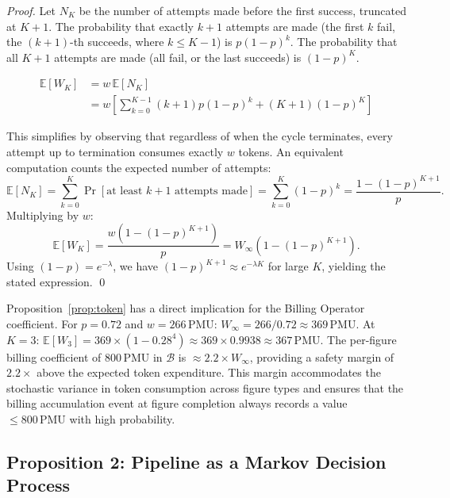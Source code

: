 \begin{proof}
Let $N_K$ be the number of attempts made before the first success, truncated at $K+1$.
The probability that exactly $k+1$ attempts are made (the first $k$ fail, the $(k+1)$-th
succeeds, where $k\leq K-1$) is $p(1-p)^k$.
The probability that all $K+1$ attempts are made (all fail, or the last succeeds) is
$(1-p)^K$.

\begin{align*}
\mathbb{E}[W_K] &= w\,\mathbb{E}[N_K] \\
&= w\left[\sum_{k=0}^{K-1}(k+1)p(1-p)^k + (K+1)(1-p)^K\right]
\end{align*}

This simplifies by observing that regardless of when the cycle terminates,
every attempt up to termination consumes exactly $w$ tokens.
An equivalent computation counts the expected number of attempts:
\[
\mathbb{E}[N_K] = \sum_{k=0}^{K}\Pr[\text{at least }k+1\text{ attempts made}]
= \sum_{k=0}^{K}(1-p)^k = \frac{1-(1-p)^{K+1}}{p}.
\]
Multiplying by $w$:
\[
\mathbb{E}[W_K] = \frac{w(1-(1-p)^{K+1})}{p} = W_\infty(1-(1-p)^{K+1}).
\]
Using $(1-p) = e^{-\lambda}$, we have $(1-p)^{K+1} \approx e^{-\lambda K}$ for large $K$,
yielding the stated expression. \qed
\end{proof}

Proposition~\ref{prop:token} has a direct implication for the Billing Operator
coefficient.
For $p=0.72$ and $w=266\,\text{PMU}$:
$W_\infty = 266/0.72 \approx 369\,\text{PMU}$.
At $K=3$:
$\mathbb{E}[W_3] = 369\times(1-0.28^4) \approx 369\times 0.9938 \approx 367\,\text{PMU}$.
The per-figure billing coefficient of $800\,\text{PMU}$ in $\mathcal{B}$ is
$\approx 2.2\times W_\infty$, providing a safety margin of $2.2\times$
above the expected token expenditure.
This margin accommodates the stochastic variance in token consumption across figure
types and ensures that the billing accumulation event at figure completion always
records a value $\leq 800\,\text{PMU}$ with high probability.

\subsection{Proposition 2: Pipeline as a Markov Decision Process}

